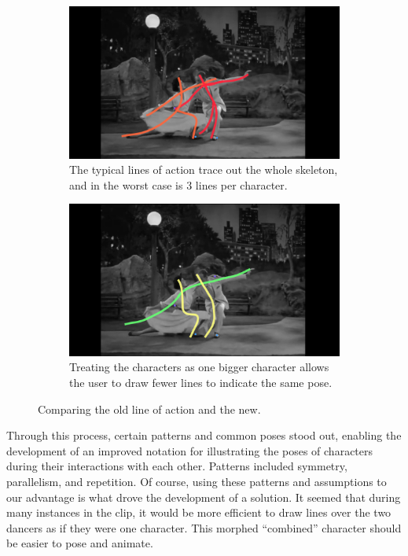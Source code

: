 \begin{figure}[h!]
	\centering
        \begin{subfigure}[b!]{0.45\textwidth}
        	\centering
                \includegraphics[width=\linewidth]{img/keyframe_case_7_baseline}
                \caption{The typical lines of action trace out the whole skeleton, and in the worst case is 3 lines per character.}
                \label{fig:baseline}
        \end{subfigure}
        \quad
        \begin{subfigure}[b!]{0.45\textwidth}
        	\centering
                \includegraphics[width=\linewidth]{img/keyframe_case_7_new}
                \caption{Treating the characters as one bigger character allows the user to draw fewer lines to indicate the same pose.}
                \label{fig:new_notation}
        \end{subfigure}%
        \caption{Comparing the old line of action and the new.}
	\label{fig:poses}
\end{figure}

Through this process, certain patterns and common poses stood out, enabling the development of an improved notation for illustrating the poses of characters during their interactions with each other. Patterns included symmetry, parallelism, and repetition. Of course, using these patterns and assumptions to our advantage is what drove the development of a solution. It seemed that during many instances in the clip, it would be more efficient to draw lines over the two dancers as if they were one character. This morphed ``combined'' character should be easier to pose and animate.


